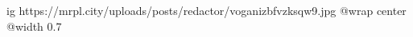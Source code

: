  
 
 
 
 

\ifcmt
  ig https://mrpl.city/uploads/posts/redactor/voganizbfvzksqw9.jpg
  @wrap center
  @width 0.7
\fi
